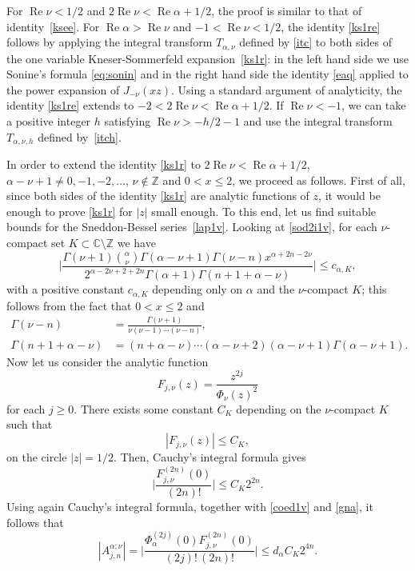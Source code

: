 \documentclass[10pt,leqno,a4paper]{article}
\theoremstyle{plain}
\newcommand{\ZZ}{\mathbb{Z}}
\newcommand{\CC}{\mathbb{C}}
\renewcommand{\Re}{\operatorname{Re}}
\numberwithin{equation}{section}
\begin{document}
For $\Re \nu < 1/2$ and $2 \Re\nu < \Re\alpha + 1/2$, the proof is similar to that of identity~\eqref{ksee}. For $\Re\alpha > \Re\nu$ and $-1 < \Re \nu < 1/2$, the identity \eqref{ks1re} follows by applying the integral transform $T_{\alpha,\nu}$ defined by \eqref{itc} to both sides of the one variable Kneser-Sommerfeld expansion~\eqref{ks1r}: in the left hand side we use Sonine's formula \eqref{eq:sonin} and in the right hand side the identity \eqref{eaq} applied to the power expansion of $J_{-\nu}(xz)$.
Using a standard argument of analyticity, the identity \eqref{ks1re} extends to $-2 < 2 \Re \nu < \Re \alpha + 1/2$. If $\Re \nu<-1$, we can take a positive integer $h$ satisfying $\Re \nu > -h/2-1$ and use the integral transform $T_{\alpha,\nu,h}$ defined by~\eqref{itch}.

In order to extend the identity \eqref{ks1r} to $2\Re \nu < \Re \alpha + 1/2$, $\alpha - \nu + 1 \neq 0,-1,-2,\dots$, $\nu \notin \ZZ$ and $0< x\leq 2$, we proceed as follows. First of all, since both sides of the identity \eqref{ks1r} are analytic functions of $z$, it would be enough to prove \eqref{ks1r} for $|z|$ small enough. To this end, let us find suitable bounds for the Sneddon-Bessel series~\eqref{lap1v}. Looking at \eqref{sod2i1v}, for each $\nu$-compact set $K\subset \CC\setminus \ZZ$ we have
\begin{equation}
\label{spmu1}
   \bigg|
   \frac{\Gamma(\nu+1)\binom{\alpha}{\nu}\Gamma(\alpha-\nu+1)\Gamma(\nu-n)x^{\alpha+2n-2\nu}}
   {2^{\alpha-2\nu+2+2n}\Gamma(\alpha+1)\Gamma(n+1+\alpha-\nu)}
   \bigg|
   \leq c_{\alpha,K},
\end{equation}
with a positive constant $c_{\alpha,K}$ depending only on $\alpha$ and the $\nu$-compact $K$; this follows from the fact that $0 < x \leq 2$ and
\begin{align*}
   \Gamma(\nu-n) &= \frac{\Gamma(\nu+1)}{\nu(\nu-1)\cdots(\nu-n)},
   \\
   \Gamma(n+1+\alpha-\nu) &= (n+\alpha-\nu) \cdots (\alpha-\nu+2)(\alpha-\nu+1) \Gamma(\alpha-\nu+1).
\end{align*}
Now let us consider the analytic function
\[
   F_{j,\nu}(z) = \frac{z^{2j}}{\Phi_\nu(z)^2}
\]
for each $j \geq 0$. There exists some constant $C_K$ depending on the $\nu$-compact $K$ such that
\[
   |F_{j,\nu}(z)| \leq C_K,
\]
on the circle $|z| = 1/2$. Then, Cauchy's integral formula gives
\[
   \bigg| \frac{F_{j,\nu}^{(2n)}(0)}{(2n)!} \bigg| \leq C_K 2^{2n}.
\]
Using again Cauchy's integral formula, together with \eqref{coed1v} and \eqref{gna}, it follows that
\begin{equation}
\label{mtc1}
   | A^{\alpha;\nu}_{j,n}|
   = \bigg|
   \frac{\Phi_\alpha^{(2j)}(0)F_{j,\nu}^{(2n)}(0)}{(2j)!\,(2n)!}
   \bigg|
   \leq d_\alpha C_K 2^{4n}.
\end{equation}
\end{document}
